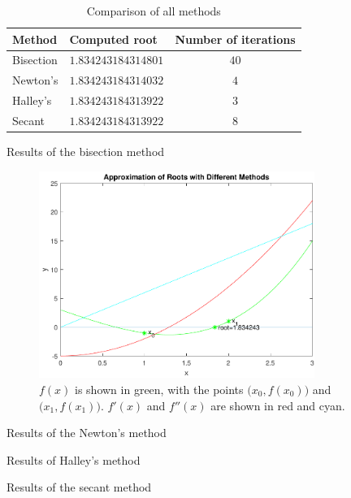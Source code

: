 \documentclass{article}
\begin{document}
\begin{enumerate}
\begin{table}[h]
  \centering
  \begin{tabular}{| l | l | c |}
  \hline
  Method & Computed root & Number of iterations\\ \hline
  Bisection & $1.834243184314801$ & $40$ \\ \hline
  Newton's & $1.834243184314032$ & $4$ \\ \hline
  Halley's & $1.834243184313922$ & $3$ \\ \hline
  Secant & $1.834243184313922$ & $8$ \\ \hline
  \end{tabular}
  \caption{Comparison of all methods}
  \label{table:roots}
\end{table}

\begin{table}[h]
  \centering
  
  \caption{Results of the bisection method}
  \label{table:bisection}
\end{table}

\begin{figure}
  \centering
  \includegraphics[width=0.8\textwidth]{q2plotv}
  \caption{$f(x)$ is shown in green, with the points $\big(x_0,f(x_0)\big)$ and $\big(x_1,f(x_1)\big)$. $f'(x)$ and $f''(x)$ are shown in red and cyan.}
  \label{fig:q2plot}
\end{figure}

\begin{table}[h]
  \centering
  
  \caption{Results of the Newton's method}
  \label{table:newton}
\end{table}

\begin{table}[h]
  \centering
  
  \caption{Results of Halley's method}
  \label{table:halley}
\end{table}

\begin{table}[h]
  \centering
  
  \caption{Results of the secant method}
  \label{table:secant}
\end{table}
\end{enumerate}
\end{document}
